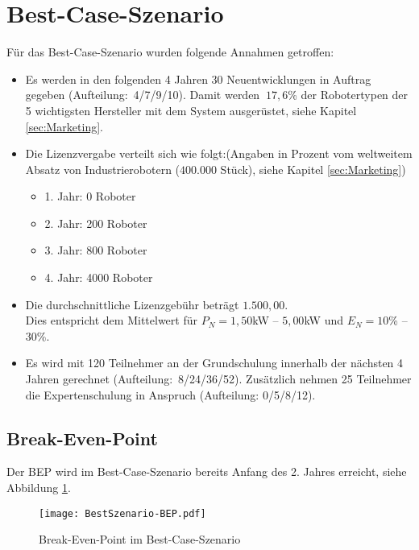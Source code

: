 \section{Best-Case-Szenario}
Für das Best-Case-Szenario wurden folgende Annahmen getroffen:
\begin{itemize}
	\item Es werden in den folgenden 4 Jahren 30 Neuentwicklungen in Auftrag gegeben (Aufteilung:~4/7/9/10). Damit werden $~17,6$\% der Robotertypen der 5 wichtigsten Hersteller mit dem System ausgerüstet, siehe Kapitel \ref{sec:Marketing}.
	\item Die Lizenzvergabe verteilt sich wie folgt:\newline (Angaben in Prozent vom weltweitem Absatz von Industrierobotern ($400.000$ Stück), siehe Kapitel \ref{sec:Marketing})
	\begin{itemize}
		\item 1. Jahr: 0 Roboter
		\item 2. Jahr: 200 Roboter
		\item 3. Jahr: 800 Roboter
		\item 4. Jahr: 4000 Roboter
	\end{itemize}
	\item Die durchschnittliche Lizenzgebühr beträgt $1.500,00$\officialeuro.\\ Dies entspricht dem Mittelwert für $P_N = 1,50$kW -- $5,00$kW und $E_N = 10$\% -- $30$\%.
	\item Es wird mit 120 Teilnehmer an der Grundschulung innerhalb der nächsten 4 Jahren gerechnet (Aufteilung:~8/24/36/52). Zusätzlich nehmen 25 Teilnehmer die Expertenschulung in Anspruch (Aufteilung: 0/5/8/12).
\end{itemize}

\subsection{Break-Even-Point}
Der BEP wird im Best-Case-Szenario bereits Anfang des 2. Jahres erreicht, siehe Abbildung \ref{fig:BestSzenario-BEP}.
\begin{figure}[h]
	\centering
	\texttt{[image: BestSzenario-BEP.pdf]}
	\caption{Break-Even-Point im Best-Case-Szenario}
	\label{fig:BestSzenario-BEP}
\end{figure}

